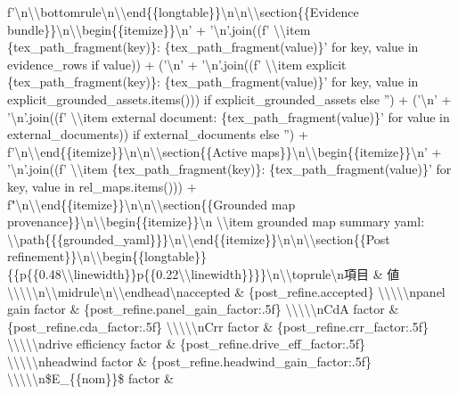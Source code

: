 \documentclass[a4paper,11pt]{article}
\begin{document}
\begin{enumerate}[leftmargin=1.8em]
f'\textbackslash{}n\textbackslash{}\textbackslash{}bottomrule\textbackslash{}n\textbackslash{}\textbackslash{}end\{\{longtable\}\}\textbackslash{}n\textbackslash{}n\textbackslash{}\textbackslash{}section\{\{Evidence bundle\}\}\textbackslash{}n\textbackslash{}\textbackslash{}begin\{\{itemize\}\}\textbackslash{}n' + '\textbackslash{}n'.join((f'  \textbackslash{}\textbackslash{}item \{tex\_path\_fragment(key)\}: \{tex\_path\_fragment(value)\}' for key, value in evidence\_rows if value)) + ('\textbackslash{}n' + '\textbackslash{}n'.join((f'  \textbackslash{}\textbackslash{}item explicit \{tex\_path\_fragment(key)\}: \{tex\_path\_fragment(value)\}' for key, value in explicit\_grounded\_assets.items())) if explicit\_grounded\_assets else '') + ('\textbackslash{}n' + '\textbackslash{}n'.join((f'  \textbackslash{}\textbackslash{}item external document: \{tex\_path\_fragment(value)\}' for value in external\_documents)) if external\_documents else '') + f'\textbackslash{}n\textbackslash{}\textbackslash{}end\{\{itemize\}\}\textbackslash{}n\textbackslash{}n\textbackslash{}\textbackslash{}section\{\{Active maps\}\}\textbackslash{}n\textbackslash{}\textbackslash{}begin\{\{itemize\}\}\textbackslash{}n' + '\textbackslash{}n'.join((f'  \textbackslash{}\textbackslash{}item \{tex\_path\_fragment(key)\}: \{tex\_path\_fragment(value)\}' for key, value in rel\_maps.items())) + f"\textbackslash{}n\textbackslash{}\textbackslash{}end\{\{itemize\}\}\textbackslash{}n\textbackslash{}n\textbackslash{}\textbackslash{}section\{\{Grounded map provenance\}\}\textbackslash{}n\textbackslash{}\textbackslash{}begin\{\{itemize\}\}\textbackslash{}n  \textbackslash{}\textbackslash{}item grounded map summary yaml: \textbackslash{}\textbackslash{}path\{\{\{grounded\_yaml\}\}\}\textbackslash{}n\textbackslash{}\textbackslash{}end\{\{itemize\}\}\textbackslash{}n\textbackslash{}n\textbackslash{}\textbackslash{}section\{\{Post refinement\}\}\textbackslash{}n\textbackslash{}\textbackslash{}begin\{\{longtable\}\}\{\{p\{\{0.48\textbackslash{}\textbackslash{}linewidth\}\}p\{\{0.22\textbackslash{}\textbackslash{}linewidth\}\}\}\}\textbackslash{}n\textbackslash{}\textbackslash{}toprule\textbackslash{}n項目 \& 値 \textbackslash{}\textbackslash{}\textbackslash{}\textbackslash{}\textbackslash{}n\textbackslash{}\textbackslash{}midrule\textbackslash{}n\textbackslash{}\textbackslash{}endhead\textbackslash{}naccepted \& \{post\_refine.accepted\} \textbackslash{}\textbackslash{}\textbackslash{}\textbackslash{}\textbackslash{}npanel gain factor \& \{post\_refine.panel\_gain\_factor:.5f\} \textbackslash{}\textbackslash{}\textbackslash{}\textbackslash{}\textbackslash{}nCdA factor \& \{post\_refine.cda\_factor:.5f\} \textbackslash{}\textbackslash{}\textbackslash{}\textbackslash{}\textbackslash{}nCrr factor \& \{post\_refine.crr\_factor:.5f\} \textbackslash{}\textbackslash{}\textbackslash{}\textbackslash{}\textbackslash{}ndrive efficiency factor \& \{post\_refine.drive\_eff\_factor:.5f\} \textbackslash{}\textbackslash{}\textbackslash{}\textbackslash{}\textbackslash{}nheadwind factor \& \{post\_refine.headwind\_gain\_factor:.5f\} \textbackslash{}\textbackslash{}\textbackslash{}\textbackslash{}\textbackslash{}n\$E\_\{\{nom\}\}\$ factor \& 
\end{enumerate}
\end{document}

